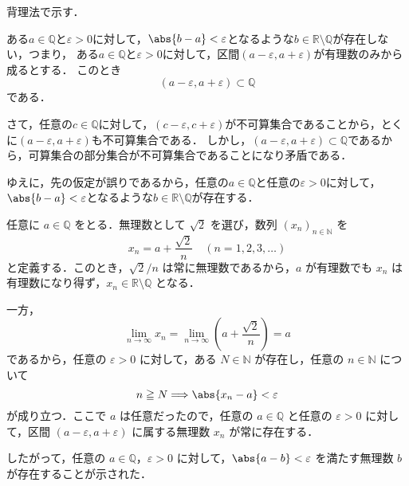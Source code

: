 

\begin{tproof}
    背理法で示す．

    ある$ a\in \mathbb{Q}$と$\varepsilon >0$に対して，$\abs{b-a}<\varepsilon$となるような$b \in \mathbb{R} \setminus \mathbb{Q}$が存在しない，つまり，
    ある$a \in \mathbb{Q}$と$\varepsilon >0$に対して，区間$(a-\varepsilon , a+ \varepsilon)$が有理数のみから成るとする．
    このとき
    \[
        (a-\varepsilon , a+ \varepsilon) \subset \mathbb{Q}
    \]
    である．

    さて，任意の$ c \in \mathbb{Q}$に対して，$ (c-\varepsilon , c+ \varepsilon)$が不可算集合であることから，とくに$(a-\varepsilon , a+ \varepsilon)$も不可算集合である．
    しかし，$(a-\varepsilon , a+ \varepsilon) \subset \mathbb{Q}$であるから，可算集合の部分集合が不可算集合であることになり矛盾である．

    ゆえに，先の仮定が誤りであるから，任意の$ a\in \mathbb{Q}$と任意の$\varepsilon >0$に対して，$\abs{b-a}<\varepsilon$となるような$b \in \mathbb{R} \setminus \mathbb{Q}$が存在する．
\end{tproof}


\begin{tproof}[別解1]
    任意に $a \in \mathbb{Q}$ をとる．無理数として $\sqrt{2}$ を選び，数列 $(x_n)_{n \in \mathbb{N}}$ を
    \[
        x_n = a + \frac{\sqrt{2}}{n}\quad (n=1,2,3,\dots)
    \]
    と定義する．このとき，$\sqrt{2}/n$ は常に無理数であるから，$a$ が有理数でも $x_n$ は有理数になり得ず，$x_n \in \mathbb{R}\setminus\mathbb{Q}$ となる．

    一方，
    \[
        \lim_{n \to \infty} x_n=\lim_{n \to \infty} \left(a + \frac{\sqrt{2}}{n}\right)=a
    \]
    であるから，任意の $\varepsilon > 0$ に対して，ある $N \in \mathbb{N}$ が存在し，任意の $n \in \mathbb{N}$ について
    \[
        n \geqq N \Longrightarrow \abs{x_n - a} < \varepsilon
    \]
    が成り立つ．ここで $a$ は任意だったので，任意の $a \in \mathbb{Q}$ と任意の $\varepsilon > 0$ に対して，区間 $(a-\varepsilon, a+\varepsilon)$ に属する無理数 $x_n$ が常に存在する．

    したがって，任意の $a \in \mathbb{Q}$，$\varepsilon > 0$ に対して，$\abs{a-b}<\varepsilon$ を満たす無理数 $b$ が存在することが示された．
\end{tproof}


